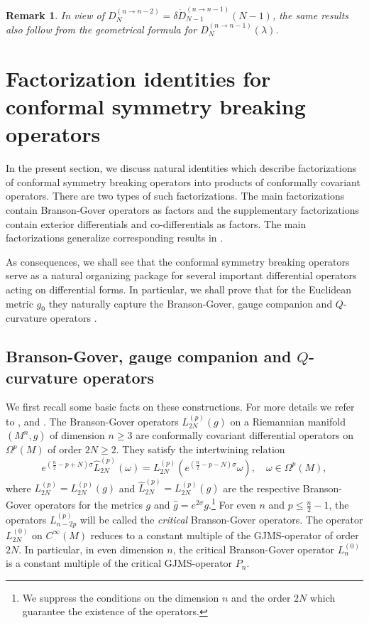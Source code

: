 \documentclass[a4paper,12pt,reqno]{amsart}
\newtheorem{bem}[theorem]{Remark}
\numberwithin{theorem}{subsection}
\numberwithin{equation}{section}
\begin{document}
\begin{bem} In view of $D_{N}^{(n\to n-2)}=\delta \dot{D}_{N-1}^{(n\to n-1)}(N-1)$, the same
results also follow from the geometrical formula for $D_N^{(n\to
n-1)}(\lambda)$.
\end{bem}

\section{Factorization identities for conformal symmetry breaking operators}\label{Properties}

In the present section, we discuss natural identities which describe
factorizations of conformal symmetry breaking operators into products of
conformally covariant operators. There are two types of such factorizations.
The main factorizations contain Branson-Gover operators as factors and the
supplementary factorizations contain exterior differentials and
co-differentials as factors. The main factorizations generalize corresponding
results in \cite{Juhl}.

As consequences, we shall see that the conformal symmetry breaking operators
serve as a natural organizing package for several important differential
operators acting on differential forms. In particular, we shall prove that for
the Euclidean metric $g_0$ they naturally capture the Branson-Gover, gauge
companion and $Q$-curvature operators \cite{BransonGover}.

\subsection{Branson-Gover, gauge companion and $Q$-curvature operators}\label{Branson-Gover}

We first recall some basic facts on these constructions. For more details we
refer to \cite{BransonGover}, \cite{Gover-Srni} and \cite{AG}. The
Branson-Gover operators $L_{2N}^{(p)}(g)$ on a Riemannian manifold $(M^n,g)$ of
dimension $n \ge 3$ are conformally covariant differential operators on
$\Omega^p(M)$ of order $2N \ge 2$. They satisfy the intertwining relation
\begin{equation}\label{conf-cov}
   e^{(\frac{n}{2}-p+N)\sigma} \hat{L}_{2N}^{(p)} (\omega)
   = L_{2N}^{(p)} (e^{(\frac{n}{2}-p-N)\sigma} \omega), \quad \omega \in \Omega^p(M),
\end{equation}
where $L_{2N}^{(p)} = L_{2N}^{(p)}(g)$ and $\hat{L}_{2N}^{(p)}=
L_{2N}^{(p)}(\hat{g})$ are the respective Branson-Gover operators for the
metrics $g$ and $\hat{g} = e^{2\sigma}g$.\footnote{We suppress the conditions
on the dimension $n$ and the order $2N$ which guarantee the existence of the
operators.} For even $n$ and $p \le \tfrac{n}{2}-1$, the operators
$L_{n-2p}^{(p)}$ will be called the {\em critical} Branson-Gover operators. The
operator $L_{2N}^{(0)}$ on $C^\infty(M)$ reduces to a constant multiple of the
GJMS-operator of order $2N$. In particular, in even dimension $n$, the critical
Branson-Gover operator $L_n^{(0)}$ is a constant multiple of the critical
GJMS-operator $P_n$.
\end{document}
